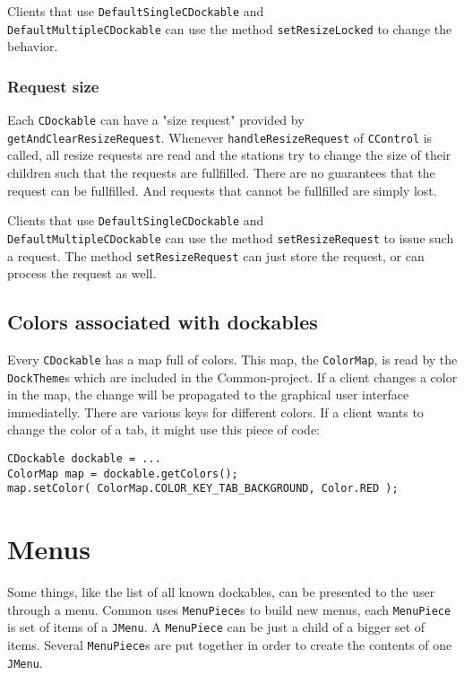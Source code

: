 \documentclass[a4paper,10pt]{article}
\newcommand{\src}[1]{\lstinline[basicstyle=\ttfamily]|#1|}
\begin{document}
Clients that use \src{DefaultSingleCDockable} and \\\src{DefaultMultipleCDockable} can use the method \src{setResizeLocked} to change the behavior.

\subsubsection{Request size}
Each \src{CDockable} can have a "size request" provided by \\\src{getAndClearResizeRequest}. Whenever \src{handleResizeRequest} of \src{CControl} is called, all resize requests are read and the stations try to change the size of their children such that the requests are fullfilled. There are no guarantees that the request can be fullfilled. And requests that cannot be fullfilled are simply lost.

Clients that use \src{DefaultSingleCDockable} and \\\src{DefaultMultipleCDockable} can use the method \src{setResizeRequest} to issue such a request. The method \src{setResizeRequest} can just store the request, or can process the request as well.

\subsection{Colors associated with dockables}
Every \src{CDockable} has a map full of colors. This map, the \src{ColorMap}, is read by the \src{DockTheme}s which are included in the Common-project. If a client changes a color in the map, the change will be propagated to the graphical user interface immediatelly. There are various keys for different colors. If a client wants to change the color of a tab, it might use this piece of code:
\begin{lstlisting}
CDockable dockable = ...
ColorMap map = dockable.getColors();
map.setColor( ColorMap.COLOR_KEY_TAB_BACKGROUND, Color.RED );
\end{lstlisting}


\section{Menus}
Some things, like the list of all known dockables, can be presented to the user through a menu. Common uses \src{MenuPiece}s to build new menus, each \src{MenuPiece} is set of items of a \src{JMenu}. A \src{MenuPiece} can be just a child of a bigger set of items. Several \src{MenuPiece}s are put together in order to create the contents of one \src{JMenu}.
\end{document}
